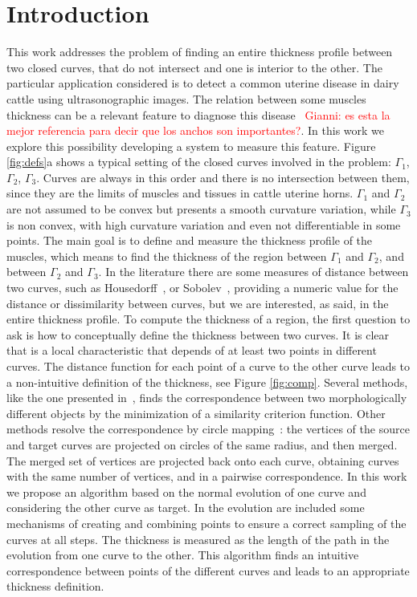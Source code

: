 \documentclass{article}
\begin{document}
\section{Introduction}
\label{sec:intro}
This work addresses the problem of finding an entire thickness profile between two closed curves, that do not intersect and one is interior to the other. The particular application considered is to detect a common uterine disease in dairy cattle using ultrasonographic images. 
The relation between some muscles thickness can be a relevant feature to diagnose this disease~\cite{Gianni2010} \textcolor{red}{Gianni: es esta la mejor referencia para decir que los anchos son importantes?}.
In this work we explore this possibility developing a system to
measure this feature. Figure \ref{fig:defs}a shows a typical setting
of the closed curves involved in the problem: $\Gamma_1$, $\Gamma_2$,
$\Gamma_3$. Curves are always in this order and there is no
intersection between them, since they are the limits of muscles and
tissues in cattle uterine horns. $\Gamma_1$ and $\Gamma_2$ are not assumed to be convex but presents a smooth curvature variation, while $\Gamma_3$ is non convex, with high curvature variation and even not differentiable in some points. The main goal is to define and measure the thickness profile of the muscles, which means to find the thickness of the region between $\Gamma_1$ and $\Gamma_2$, and between $\Gamma_2$ and $\Gamma_3$. In the literature there are some measures of distance between two curves, such as Housedorff~\cite{libroMorel}, or Sobolev~\cite{statistics}, providing a numeric value for the distance or dissimilarity between curves, but we are interested, as said, in the entire thickness profile. To compute the thickness of a region, the first question to ask is how to conceptually define the thickness between two curves. It is clear that is a local characteristic that depends of at least two points in different curves. The distance function for each point of a curve to the other curve leads to a non-intuitive definition of the thickness, see Figure \ref{fig:comp}. Several methods, like the one presented in~\cite{paperWarping}, finds the correspondence between two morphologically different objects by the minimization of a similarity criterion function. Other methods resolve the correspondence by circle mapping~\cite{libro}: the vertices of the source and target curves are projected on circles of the same radius, and then merged. The merged set of vertices are projected back onto each curve, obtaining curves with the same number of vertices, and in a pairwise correspondence. In this work we propose an algorithm based on the normal evolution of one curve and considering the other curve as target. In the evolution are included some mechanisms of creating and combining points to ensure a correct sampling of the curves at all steps. The thickness is measured as the length of the path in the evolution from one curve to the other. This algorithm finds an intuitive correspondence between points of the different curves and leads to an appropriate thickness definition.
\end{document}
